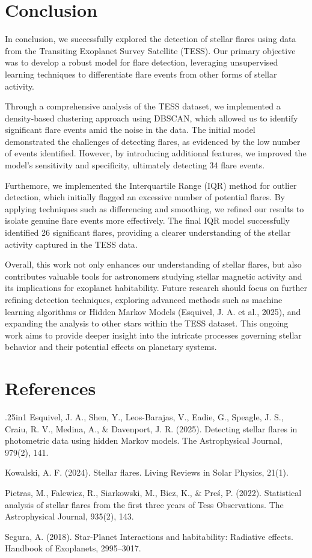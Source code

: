 \documentclass{article}
\begin{document}
\section{Conclusion}
In conclusion, we successfully explored the detection of stellar flares using data from the Transiting Exoplanet Survey Satellite (TESS). Our primary objective was to develop a robust model for flare detection, leveraging unsupervised learning techniques to differentiate flare events from other forms of stellar activity.

Through a comprehensive analysis of the TESS dataset, we implemented a density-based clustering approach using DBSCAN, which allowed us to identify significant flare events amid the noise in the data. The initial model demonstrated the challenges of detecting flares, as evidenced by the low number of events identified. However, by introducing additional features, we improved the model's sensitivity and specificity, ultimately detecting 34 flare events.

Furthemore, we implemented the Interquartile Range (IQR) method for outlier detection, which initially flagged an excessive number of potential flares. By applying techniques such as differencing and smoothing, we refined our results to isolate genuine flare events more effectively. The final IQR model successfully identified 26 significant flares, providing a clearer understanding of the stellar activity captured in the TESS data.

Overall, this work not only enhances our understanding of stellar flares, but also contributes valuable tools for astronomers studying stellar magnetic activity and its implications for exoplanet habitability. Future research should focus on further refining detection techniques, exploring advanced methods such as machine learning algorithms or Hidden Markov Models (Esquivel, J. A. et al., 2025), and expanding the analysis to other stars within the TESS dataset. This ongoing work aims to provide deeper insight into the intricate processes governing stellar behavior and their potential effects on planetary systems.

\section{References}
\begin{hangparas}{.25in}{1}
Esquivel, J. A., Shen, Y., Leos-Barajas, V., Eadie, G., Speagle, J. S., Craiu, R. V., Medina, A., \& Davenport, J. R. (2025). Detecting stellar flares in photometric data using hidden Markov models. The Astrophysical Journal, 979(2), 141.

Kowalski, A. F. (2024). Stellar flares. Living Reviews in Solar Physics, 21(1).

Pietras, M., Falewicz, R., Siarkowski, M., Bicz, K., \& Preś, P. (2022). Statistical analysis of stellar flares from the first three years of Tess Observations. The Astrophysical Journal, 935(2), 143.

Segura, A. (2018). Star-Planet Interactions and habitability: Radiative effects. Handbook of Exoplanets, 2995–3017.
\end{hangparas}
\end{document}
